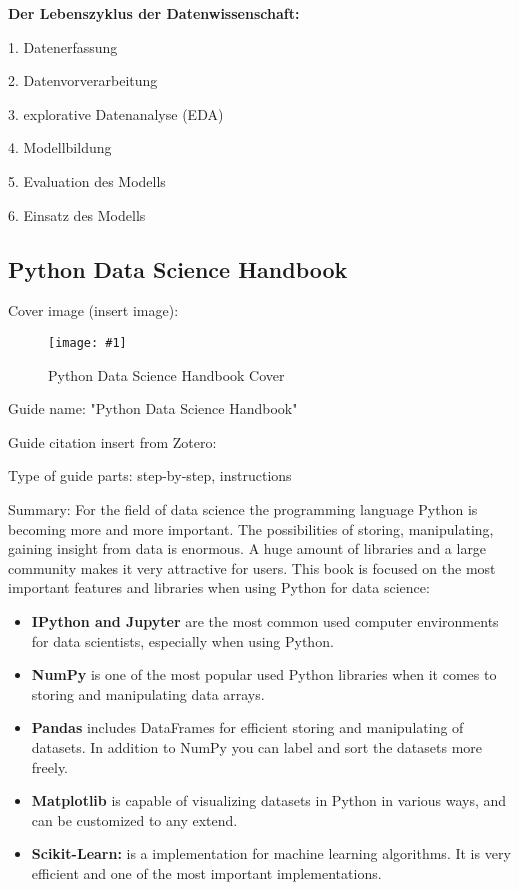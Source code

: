 \documentclass{article}
\newlength{\imgwidth}
\newcommand\scaledgraphics[2]{%
                
\settowidth{\imgwidth}{\texttt{[image: \#1]}}%
                
\setlength{\imgwidth}{\minof{\imgwidth}{#2\textwidth}}%
                
\texttt{[image: \#1]}%
                
}
\begin{document}
\textbf{Der Lebenszyklus der Datenwissenschaft:}


1. Datenerfassung 


2. Datenvorverarbeitung 


3. explorative Datenanalyse (EDA) 


4. Modellbildung


5. Evaluation des Modells 


6. Einsatz des Modells 


\subsection{Python Data Science Handbook}\label{H4727243}



Cover image (insert image):


\begin{center}
\begin{figure}
\scaledgraphics{43052757-2454-42ab-a98c-c7977cb4e249.png}{0.5}
\caption*{Python Data Science Handbook Cover}\label{F16921711}
\end{figure}


\end{center}


Guide name: "Python Data Science Handbook"


Guide citation insert from Zotero: \autocite{vanderplas_python_2016}


Type of guide parts: step-by-step, instructions


Summary: For the field of data science the programming language Python is becoming more and more important. The possibilities of storing, manipulating, gaining insight from data is enormous. A huge amount of libraries and a large community makes it very attractive for users. This book is focused on the most important features and libraries when using Python for data science: 

\begin{itemize}
\item \textbf{IPython and Jupyter} are the most common used computer environments for data scientists, especially when using Python.


\item \textbf{NumPy }is one of the most popular used Python libraries when it comes to storing and manipulating data arrays.


\item \textbf{Pandas }includes DataFrames for efficient storing and manipulating of datasets. In addition to NumPy you can label and sort the datasets more freely.


\item \textbf{Matplotlib }is capable of visualizing datasets in Python in various ways, and can be customized to any extend.


\item \textbf{Scikit-Learn: }is a implementation for machine learning algorithms. It is very efficient and one of the most important implementations.


\end{itemize}
\end{document}
